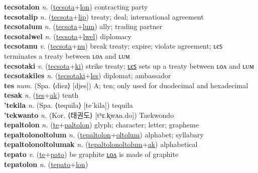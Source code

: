 \textbf{tecsotalon} \textit{n.} (\hyperref[tecsota]{tecsota}+\hyperref[lon]{lon})
contracting party \label{tecsotalon} \\
\textbf{tecsotalip} \textit{n.} (\hyperref[tecsota]{tecsota}+\hyperref[lip]{lip})
treaty; deal; international agreement \label{tecsotalip} \\
\textbf{tecsotalum} \textit{n.} (\hyperref[tecsota]{tecsota}+\hyperref[lum]{lum})
ally; trading partner \label{tecsotalum} \\
\textbf{tecsotalwel} \textit{n.} (\hyperref[tecsota]{tecsota}+\hyperref[lwel]{lwel})
diplomacy \label{tecsotalwel} \\
\textbf{tecsotanu} \textit{v.} (\hyperref[tecsota]{tecsota}+\hyperref[nu]{nu})
break treaty; expire; violate agreement; ʟєꜱ terminates a treaty between ʟᴏᴧ and ʟᴜᴍ \label{tecsotanu} \\
\textbf{tecsotaki} \textit{v.} (\hyperref[tecsota]{tecsota}+\hyperref[ki]{ki})
strike treaty; \hyperref[tecsotakiles]{ʟєꜱ} sets up a treaty between ʟᴏᴧ and ʟᴜᴍ \label{tecsotaki} \\
\textbf{tecsotakiles} \textit{n.} (\hyperref[tecsotaki]{tecsotaki}+\hyperref[les]{les})
diplomat; ambassador \label{tecsotakiles} \\
\textbf{tes} \textit{num.} (Spa. ⟨diez⟩ [djes])
A; ten; only used for duodecimal and hexadecimal \label{tes} \\
\textbf{tesak} \textit{n.} (\hyperref[tes]{tes}+\hyperref[ak]{ak})
tenth \label{tesak} \\
\textbf{'tekila} \textit{n.} (Spa. ⟨tequila⟩ [teˈkila])
tequila \label{'tekila} \\
\textbf{'tekwanto} \textit{n.} (Kor. ⟨태권도⟩ [tʰɛ.k͈wʌn.do])
Taekwondo \label{'tekwanto} \\
\textbf{tepaltolon} \textit{n.} (\hyperref[te]{te}+\hyperref[paltolon]{paltolon})
glyph; character; letter; grapheme \label{tepaltolon} \\
\textbf{tepaltolonoltolum} \textit{n.} (\hyperref[tepaltolon]{tepaltolon}+\hyperref[oltolum]{oltolum})
alphabet; syllabary \label{tepaltolonoltolum} \\
\textbf{tepaltolonoltolumak} \textit{n.} (\hyperref[tepaltolonoltolum]{tepaltolonoltolum}+\hyperref[ak]{ak})
alphabetical \label{tepaltolonoltolumak} \\
\textbf{tepato} \textit{v.} (\hyperref[te]{te}+\hyperref[pato]{pato})
be graphite \hyperref[tepatolon]{ʟᴏᴧ} is made of graphite \label{tepato} \\
\textbf{tepatolon} \textit{n.} (\hyperref[tepato]{tepato}+\hyperref[lon]{lon})
